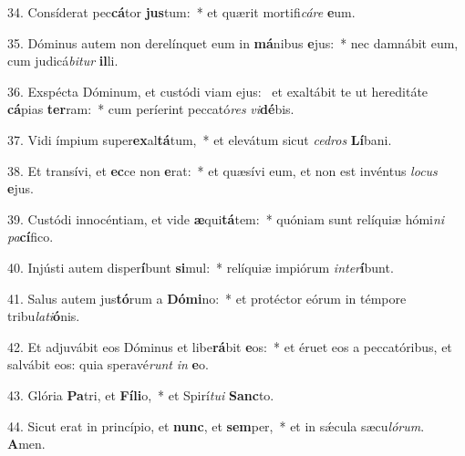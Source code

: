 34. Consíderat pec\textbf{cá}tor \textbf{jus}tum:~*  et quærit mortifi\textit{cá}\textit{re} \textbf{e}um.\

35. Dóminus autem non derelínquet eum in \textbf{má}nibus \textbf{e}jus:~*  nec damnábit eum, cum judicá\textit{bi}\textit{tur} \textbf{il}li.\

36. Exspécta Dóminum, et custódi viam ejus: \dag\  et exaltábit te ut hereditáte \textbf{cá}pias \textbf{ter}ram:~*  cum períerint peccató\textit{res} \textit{vi}\textbf{dé}bis.\

37. Vidi ímpium super\textbf{ex}al\textbf{tá}tum,~*  et elevátum sicut \textit{ce}\textit{dros} \textbf{Lí}bani.\

38. Et transívi, et \textbf{ec}ce non \textbf{e}rat:~*  et quæsívi eum, et non est invéntus \textit{lo}\textit{cus} \textbf{e}jus.\

39. Custódi innocéntiam, et vide \textbf{æ}qui\textbf{tá}tem:~*  quóniam sunt relíquiæ hómi\textit{ni} \textit{pa}\textbf{cí}fico.\

40. Injústi autem disper\textbf{í}bunt \textbf{si}mul:~*  relíquiæ impiórum \textit{in}\textit{ter}\textbf{í}bunt.\

41. Salus autem jus\textbf{tó}rum a \textbf{Dó}\textbf{mi}no:~*  et protéctor eórum in témpore tribu\textit{la}\textit{ti}\textbf{ó}nis.\

42. Et adjuvábit eos Dóminus et libe\textbf{rá}bit \textbf{e}os:~*  et éruet eos a peccatóribus, et salvábit eos: quia speravé\textit{runt} \textit{in} \textbf{e}o.\

43. Glória \textbf{Pa}tri, et \textbf{Fí}\textbf{li}o,~*  et Spirí\textit{tu}\textit{i} \textbf{Sanc}to.\

44. Sicut erat in princípio, et \textbf{nunc}, et \textbf{sem}per,~*  et in sǽcula sæcu\textit{ló}\textit{rum}. \textbf{A}men.\


